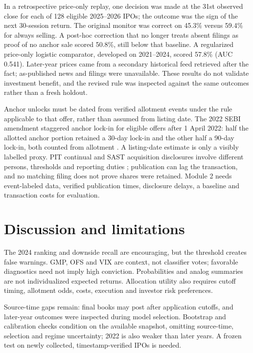 \documentclass[runningheads]{llncs}
\begin{document}
In a retrospective price-only replay, one decision was made at the 31st observed close for each of 128 eligible 2025--2026 IPOs; the outcome was the sign of the next 30-session return. The original monitor was correct on 45.3\% versus 59.4\% for always selling. A post-hoc correction that no longer treats absent filings as proof of no anchor sale scored 50.8\%, still below that baseline. A regularized price-only logistic comparator, developed on 2021--2024, scored 57.8\% (AUC 0.541). Later-year prices came from a secondary historical feed retrieved after the fact; as-published news and filings were unavailable. These results do not validate investment benefit, and the revised rule was inspected against the same outcomes rather than a fresh holdout.

Anchor unlocks must be dated from verified allotment events under the rule applicable to that offer, rather than assumed from listing date. The 2022 SEBI amendment staggered anchor lock-in for eligible offers after 1 April 2022: half the allotted anchor portion retained a 30-day lock-in and the other half a 90-day lock-in, both counted from allotment \cite{ref12}. A listing-date estimate is only a visibly labelled proxy. PIT continual and SAST acquisition disclosures involve different persons, thresholds and reporting duties \cite{ref13,ref14}; publication can lag the transaction, and no matching filing does not prove shares were retained. Module 2 needs event-labeled data, verified publication times, disclosure delays, a baseline and transaction costs for evaluation.

\section{Discussion and limitations}
The 2024 ranking and downside recall are encouraging, but the threshold creates false warnings. GMP, OFS and VIX are context, not classifier votes; favorable diagnostics need not imply high conviction. Probabilities and analog summaries are not individualized expected returns. Allocation utility also requires cutoff timing, allotment odds, costs, execution and investor risk preferences.

Source-time gaps remain: final books may post after application cutoffs, and later-year outcomes were inspected during model selection. Bootstrap and calibration checks condition on the available snapshot, omitting source-time, selection and regime uncertainty; 2022 is also weaker than later years. A frozen test on newly collected, timestamp-verified IPOs is needed.
\end{document}
